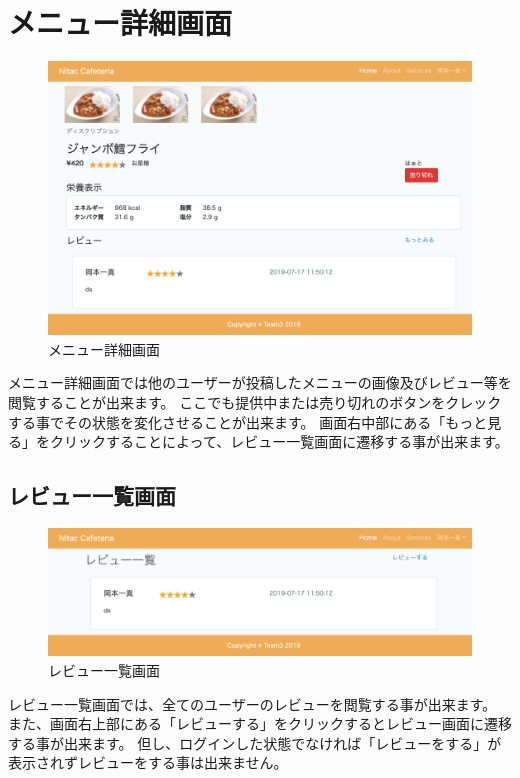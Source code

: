 \documentclass[a4paper]{ltjsarticle}
\begin{document}
\section{メニュー詳細画面}
    \begin{figure}[htbp]
    \centering
        \caption{メニュー詳細画面}
        \includegraphics[scale = 0.3]{image/detail.png}
    \end{figure}
    メニュー詳細画面では他のユーザーが投稿したメニューの画像及びレビュー等を閲覧することが出来ます。
    ここでも提供中または売り切れのボタンをクレックする事でその状態を変化させることが出来ます。
    画面右中部にある「もっと見る」をクリックすることによって、レビュー一覧画面に遷移する事が出来ます。

\subsection{レビュー一覧画面}
    \begin{figure}[htbp]
    \centering
        \caption{レビュー一覧画面}
        \includegraphics[scale = 0.3]{image/review.png}
    \end{figure}
    レビュー一覧画面では、全てのユーザーのレビューを閲覧する事が出来ます。
    また、画面右上部にある「レビューする」をクリックするとレビュー画面に遷移する事が出来ます。
    但し、ログインした状態でなければ「レビューをする」が表示されずレビューをする事は出来ません。
    \newpage
\end{document}
